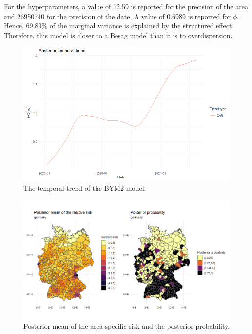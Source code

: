 For the hyperparameters, a value of 12.59 is reported for the precision of the area and 26950740 for the precision of the date, A value of 0.6989 is reported for $\phi$. Hence, 69.89\% of the marginal variance is explained by the structured effect. Therefore, this model is closer to a Besag model than it is to overdispersion.
\begin{figure}[H]
  \centering
  \includegraphics[width = \textwidth]{temporal_trend_germany.png}
  \caption{The temporal trend of the BYM2 model.}
  \label{temporal_trend_germany}
\end{figure}
\begin{figure}[H]
  \centering
  \includegraphics[width = \textwidth]{posterior_germany_temporal.png}
  \caption{Posterior mean of the area-specific risk and the posterior probability.}
  \label{posterior_germany_temporal}
\end{figure}
